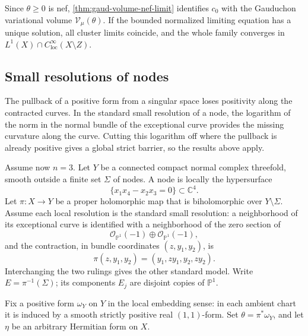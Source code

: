 Since $\theta\geq0$ is nef, \cref{thm:gaud-volume-nef-limit} identifies $c_0$ with the Gauduchon variational volume $\mathcal V_\mu(\theta)$. If the bounded normalized limiting equation has a unique solution, all cluster limits coincide, and the whole family converges in $L^1(X)\cap C^\infty_{\mathrm{loc}}(X\setminus Z)$.

\subsection{Small resolutions of nodes}
\label{subsec:nodal-small-resolution}

The pullback of a positive form from a singular space loses positivity along the contracted curves. In the standard small resolution of a node, the logarithm of the norm in the normal bundle of the exceptional curve provides the missing curvature along the curve. Cutting this logarithm off where the pullback is already positive gives a global strict barrier, so the results above apply.

Assume now $n=3$. Let $Y$ be a connected compact normal complex threefold, smooth outside a finite set $\Sigma$ of nodes. A node is locally the hypersurface
\[
 \{x_1x_4-x_2x_3=0\}\subset\mathbb C^4.
\]
Let $\pi\colon X\to Y$ be a proper holomorphic map that is biholomorphic over $Y\setminus\Sigma$. Assume each local resolution is the standard small resolution: a neighborhood of its exceptional curve is identified with a neighborhood of the zero section of
\[
 \mathcal O_{\mathbb P^1}(-1)\oplus\mathcal O_{\mathbb P^1}(-1),
\]
and the contraction, in bundle coordinates $(z,y_1,y_2)$, is
\begin{equation}\label{eq:nodal-contraction-chart}
 \pi(z,y_1,y_2)=(y_1,zy_1,y_2,zy_2).
\end{equation}
Interchanging the two rulings gives the other standard model. Write $E=\pi^{-1}(\Sigma)$; its components $E_j$ are disjoint copies of $\mathbb P^1$.

Fix a positive form $\omega_Y$ on $Y$ in the local embedding sense: in each ambient chart it is induced by a smooth strictly positive real $(1,1)$-form. Set $\theta=\pi^*\omega_Y$, and let $\eta$ be an arbitrary Hermitian form on $X$.


